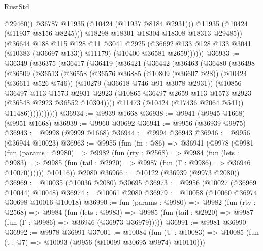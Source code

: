\begin{lexlean}{RustStd}
\begin{coremodule}
                        @29460))
                    @36787
                    @11935
                    (@10424 (@11937 @8184 @2931)))
                  @11935
                  (@10424 (@11937 @8156 @8245)))
                @18298
                @18301
                @18304
                @18308
                @18313
                @29485))
            (@36644
              @188
              @115
              @128
              @11
              @3041
              @2925
              (@36692 @133 @128 @133 @3041 (@10383 (@36697 @133)) @11179)
              (@10400 @36581 @2659))))))
@36933 := @36349
    (@36375
      (@36417
        (@36419
          (@36421
            (@36442
              (@36463
                (@36480
                  (@36498
                    (@36509
                      (@36513
                        (@36558
                          (@36576
                            @36885
                            (@10809 (@36607 @28))
                            (@10424 (@36611 @526 @746))
                            (@10279 (@36618 @746 @91 @3078 @2931))
                            (@10856
                              @36497
                              @113
                              @1573
                              @2931
                              @2923
                              (@10865 @36497 @2659 @113 @1573 @2923 (@36548 @2923 @36552 @10394))))
                          @11473
                          (@10424 (@17436 @2064 @541))
                          @11486)))))))))))
@36934 := @9939 @1668
@36938 := @9941 (@9945 @1668) (@9951 @1668)
@36939 := @9960 @30692
@36941 := @9956 (@36939 @9975)
@36943 := @9998 (@9999 @1668)
@36944 := @9994 @36943
@36946 := @9956 (@36944 @10023)
@36963 := @9955
    (fun (fn : @86) =>
    @36941
      (@9978
        (@9981
          (fun (params : @9980) =>
          @9982
            (fun (rty : @2568) =>
            @9984
              (fun (lets : @9983) =>
              @9985 (fun (tail : @2920) => @9987 (fun (Γ : @9986) => @36946 @10070))))))
        @10116))
    @2080
@36966 := @10122 (@36939 (@9973 @2080))
@36969 := @10035 (@10036 @2080) @30695
@36973 := @9956 (@10027 (@36969 @10044) @10048)
@36974 := @10061 @2080
@36979 := @10058 (@10060 @36974 @30698 @10016 @10018)
@36990 := fun (params : @9980) =>
  @9982
    (fun (rty : @2568) =>
    @9984
      (fun (lets : @9983) =>
      @9985 (fun (tail : @2920) => @9987 (fun (Γ : @9986) => @36946 (@36973 @36979)))))
@36991 := @9981 @36990
@36992 := @9978 @36991
@37001 := @10084
    (fun (U : @10083) => @10085 (fun (t : @7) => @10093 (@9956 (@10099 @30695 @9974) @10110)))

\end{coremodule}
\end{lexlean}
